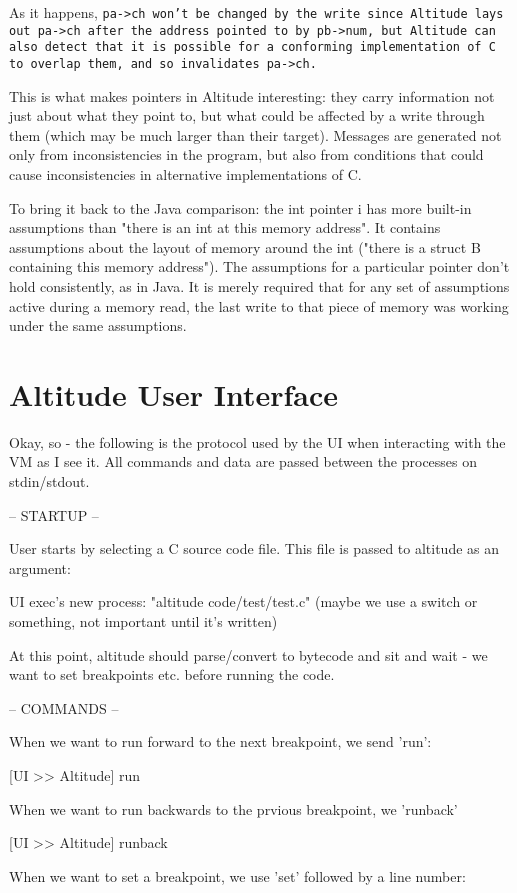 \documentclass[10pt,a4paper]{report}
\begin{document}
As it happens, \tt{pa->ch} won't be changed by the write since Altitude lays out pa->ch after the address pointed to by pb->num, but Altitude can also detect that it is possible for a conforming implementation of C to overlap them, and so invalidates pa->ch.

This is what makes pointers in Altitude interesting: they carry information not just about what they point to, but what could be affected by a write through them (which may be much larger than their target). Messages are generated not only from inconsistencies in the program, but also from conditions that could cause inconsistencies in alternative implementations of C.

To bring it back to the Java comparison: the int pointer i has more built-in assumptions than "there is an int at this memory address". It contains assumptions about the layout of memory around the int ("there is a struct B containing this memory address"). The assumptions for a particular pointer don't hold consistently, as in Java. It is merely required that for any set of assumptions active during a memory read, the last write to that piece of memory was working under the same assumptions.

\section{Altitude User Interface}
Okay, so - the following is the protocol used by the UI when interacting with the VM as I see it. All commands and data are passed between the processes on stdin/stdout.


-- STARTUP --

User starts by selecting a C source code file. This file is passed to altitude as an argument:

UI exec's new process: "altitude code/test/test.c" (maybe we use a switch or something, not important until it's written)

At this point, altitude should parse/convert to bytecode and sit and wait - we want to set breakpoints etc. before running the code.


-- COMMANDS --

When we want to run forward to the next breakpoint, we send 'run':

[UI >> Altitude]
run

When we want to run backwards to the prvious breakpoint, we 'runback'

[UI >> Altitude]
runback

When we want to set a breakpoint, we use 'set' followed by a line number:
\end{document}
